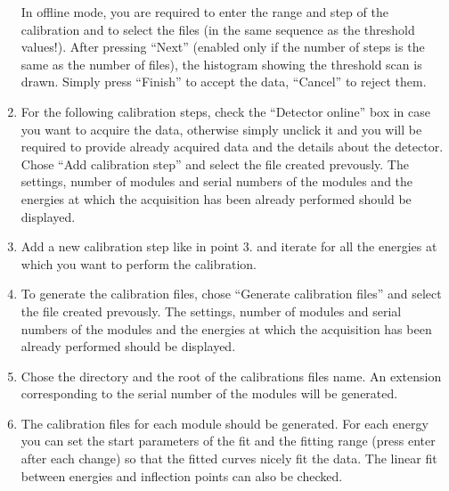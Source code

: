 \documentclass{report}
\begin{document}
\begin{enumerate}
In offline mode, you are required to enter the range and step of the calibration and to select the  files (in the same sequence as the threshold values!). After pressing ``Next'' (enabled only if the number of steps is the same as the number of files), the histogram showing the threshold scan is drawn. Simply press ``Finish'' to accept the data, ``Cancel'' to reject them.
\item For the following calibration steps, check the ``Detector online'' box in case you want to acquire the data, otherwise simply unclick it and you will be required to provide already acquired data and the details about the detector.\\ Chose ``Add calibration step'' and select the file created prevously. The settings, number of modules and serial numbers of the modules and the energies at which the acquisition has been already performed should be displayed.
\item Add a new calibration step like in point 3. and iterate for all the energies at which you want to perform the calibration.
\item To generate the calibration files, chose ``Generate calibration files'' and select the file created prevously. The settings, number of modules and serial numbers of the modules and the energies at which the acquisition has been already performed should be displayed.
\item Chose the directory and the root of the calibrations files name. An extension corresponding to the serial number of the modules will be generated. 
\item The calibration files for each module should be generated. For each energy you can set the start parameters of the fit and the fitting range (press enter after each change) so that the fitted curves nicely fit the data. The linear fit between energies and inflection points can also be checked.
\end{enumerate}
\end{document}
